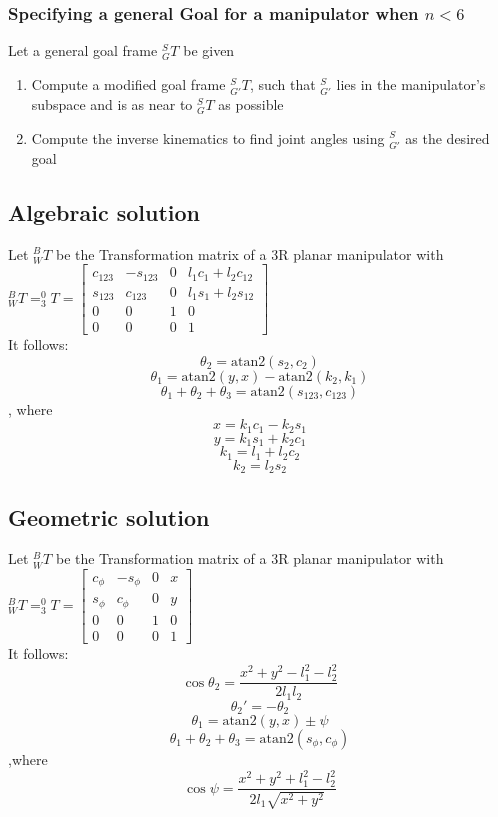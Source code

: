 \documentclass[10pt,a4paper]{article}
\newcommand{\atan}{\ensuremath{\mathrm{atan2 }}}
\begin{document}
\subsubsection{Specifying a general Goal for a manipulator when $n < 6$}
Let a general goal frame $^S_GT$ be given
\begin{enumerate}
	\item Compute a modified goal frame $^S_{G'}T$, such that $^S_{G'}$ lies in the manipulator's subspace and is as near to $^S_GT$ as possible
	\item Compute the inverse kinematics to find joint angles using $^S_{G'}$ as the desired goal
\end{enumerate}

\subsection{Algebraic solution}
Let $^B_WT$ be the Transformation matrix of a 3R planar manipulator with \\
$^B_WT = ^0_3T = \begin{bmatrix}
	c_{123} & -s_{123} & 0 & l_1c_1 + l_2c_{12} \\
	s_{123} & c_{123} & 0 & l_1s_1 + l_2s_{12} \\
	0 & 0 & 1 & 0 \\
	0 & 0 & 0 & 1
\end{bmatrix}$ \\
It follows:
$$
	\theta_2 = \atan(s_2,c_2)
$$
$$
	\theta_1 = \atan(y,x) - \atan(k_2,k_1)
$$
$$
	\theta_1 + \theta_2 + \theta_3 = \atan(s_{123}, c_{123})
$$, where
$$
	x = k_1c_1 - k_2s_1
$$
$$
	y = k_1s_1 + k_2c_1
$$
$$
	k_1 = l_1 + l_2c_2
$$
$$
	k_2 = l_2s_2
$$

\subsection{Geometric solution}
Let $^B_WT$ be the Transformation matrix of a 3R planar manipulator with \\
$^B_WT = ^0_3T = \begin{bmatrix}
c_\phi & -s_\phi & 0 & x \\
s_\phi & c_\phi & 0 & y \\
0 & 0 & 1 & 0 \\
0 & 0 & 0 & 1
\end{bmatrix}$ \\
It follows:
$$
	\cos \theta_2 = \frac{x^2 + y^2 - l_1^2 - l_2^2}{2 l_1 l_2}
$$
$$
	\theta_2' = -\theta_2
$$
$$
	\theta_1 = \atan(y,x) \pm \psi
$$
$$
	\theta_1 + \theta_2 + \theta_3 = \atan(s_\phi, c_\phi)
$$
,where
$$
	\cos \psi = \frac{x^2 + y^2 + l_1^2 - l_2^2}{2l_1 \sqrt{x^2 + y^2}}
$$
\end{document}
